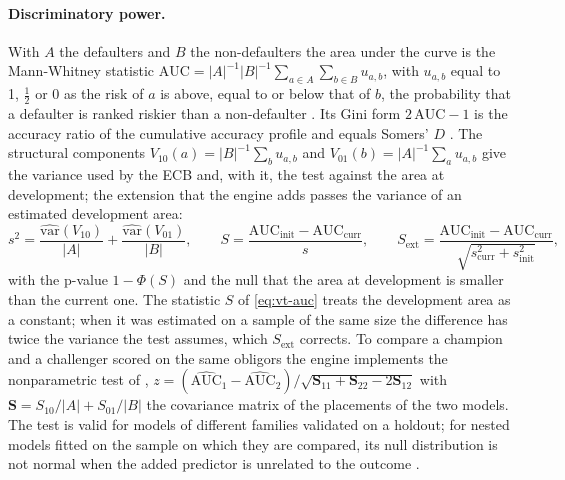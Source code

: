 \paragraph{Discriminatory power.} With $A$ the defaulters and $B$ the non-defaulters the area under the curve is the Mann-Whitney statistic
$\mathrm{AUC}=|A|^{-1}|B|^{-1}\sum_{a\in A}\sum_{b\in B}u_{a,b}$, with $u_{a,b}$ equal to 1, $\tfrac12$ or 0 as the risk of $a$ is above, equal to or below that of $b$, the probability that a
defaulter is ranked riskier than a non-defaulter \citep{credit-scoring:hanley1982}. Its Gini form $2\,\mathrm{AUC}-1$ is the accuracy ratio of the cumulative accuracy profile and equals Somers'
$D$ \citep{validation-tests:somers1962}. The structural components $V_{10}(a)=|B|^{-1}\sum_bu_{a,b}$ and $V_{01}(b)=|A|^{-1}\sum_au_{a,b}$ give the variance used by the ECB and, with it,
the test against the area at development; the extension that the engine adds passes the variance of an estimated development area:
\begin{equation}
  s^2=\frac{\widehat{\mathrm{var}}(V_{10})}{|A|}+\frac{\widehat{\mathrm{var}}(V_{01})}{|B|},\qquad
  S=\frac{\mathrm{AUC}_{\mathrm{init}}-\mathrm{AUC}_{\mathrm{curr}}}{s},\qquad
  S_{\mathrm{ext}}=\frac{\mathrm{AUC}_{\mathrm{init}}-\mathrm{AUC}_{\mathrm{curr}}}{\sqrt{s_{\mathrm{curr}}^2+s_{\mathrm{init}}^2}},
  \label{eq:vt-auc}
\end{equation}
with the p-value $1-\Phi(S)$ and the null that the area at development is smaller than the current one. The statistic $S$ of \cref{eq:vt-auc} treats the development area as a constant; when it was estimated
on a sample of the same size the difference has twice the variance the test assumes, which $S_{\mathrm{ext}}$ corrects. To compare a champion and a challenger scored on the same obligors the
engine implements the nonparametric test of \citet{credit-scoring:delong1988}, $z=(\widehat{\mathrm{AUC}}_1-\widehat{\mathrm{AUC}}_2)/\sqrt{\mathbf S_{11}+\mathbf S_{22}-2\mathbf S_{12}}$ with $\mathbf S=S_{10}/|A|+S_{01}/|B|$
the covariance matrix of the placements of the two models. The test is valid for models of different families validated on a holdout; for nested models fitted on the sample on which they are compared, its null
distribution is not normal when the added predictor is unrelated to the outcome \citep{validation-tests:demler2012}.

